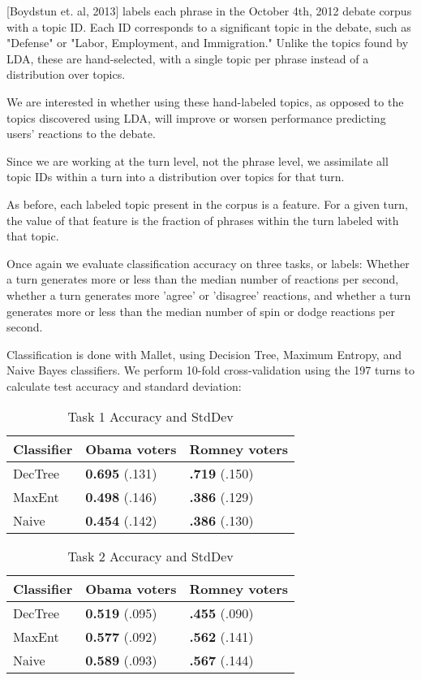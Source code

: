 
[Boydstun et. al, 2013] labels each phrase in the October 4th, 2012 debate corpus with a topic ID. Each ID corresponds to a significant topic in the debate, such as "Defense" or "Labor, Employment, and Immigration." Unlike the topics found by LDA, these are hand-selected, with a single topic per phrase instead of a distribution over topics.

We are interested in whether using these hand-labeled topics, as opposed to the topics discovered using LDA, will improve or worsen performance predicting users' reactions to the debate.

Since we are working at the turn level, not the phrase level, we assimilate all topic IDs within a turn into a distribution over topics for that turn.

As before, each labeled topic present in the corpus is a feature. For a given turn, the value of that feature is the fraction of phrases within the turn labeled with that topic.

Once again we evaluate classification accuracy on three tasks, or labels: Whether a turn generates more or less than the median number of reactions per second, whether a turn generates more 'agree' or 'disagree' reactions, and whether a turn generates more or less than the median number of spin or dodge reactions per second.

Classification is done with Mallet, using Decision Tree, Maximum Entropy, and Naive Bayes classifiers. We perform 10-fold cross-validation using the 197 turns to calculate test accuracy and standard deviation:

\begin{table}[H]
\begin{centering}
\begin{tabular}{ l | l | l }
Classifier & Obama voters & Romney voters \\
\hline
DecTree & \textbf{0.695} (.131) &  \textbf{.719} (.150) \\
MaxEnt & \textbf{0.498} (.146) &  \textbf{.386} (.129) \\
Naive & \textbf{0.454} (.142) &  \textbf{.386} (.130) \\
\end{tabular}
\caption{Task 1 Accuracy and StdDev}
\end{centering}
\end{table}

\begin{table}[H]
\begin{centering}
\begin{tabular}{ l | l | l }
Classifier & Obama voters & Romney voters \\
\hline
DecTree & \textbf{0.519} (.095) &  \textbf{.455} (.090) \\
MaxEnt & \textbf{0.577} (.092) &  \textbf{.562} (.141) \\
Naive & \textbf{0.589} (.093) &  \textbf{.567} (.144) \\
\end{tabular}
\caption{Task 2 Accuracy and StdDev}
\end{centering}
\end{table}

